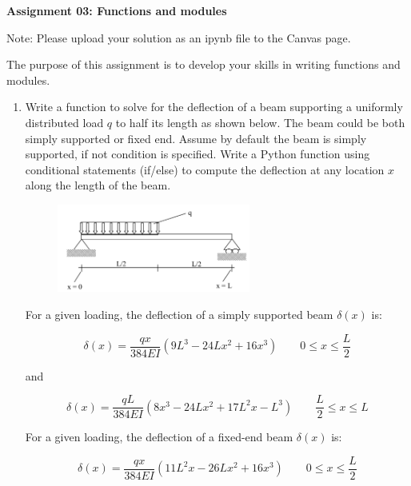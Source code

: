 \documentclass[a4paper,12pt]{article}
\begin{document}
\begin{centering}
	\textbf{
		Assignment 03: Functions and modules\\
	}
\end{centering}


Note: Please upload your solution as an ipynb file to the Canvas page.

\vspace{1em}
 
 The purpose of this assignment is to develop your skills in writing functions and modules.
 
\begin{enumerate}
	
	\item Write a function to solve for the deflection of a beam supporting a uniformly distributed load $q$ to half its length as shown below. The beam could be both simply supported or fixed end. Assume by default the beam is simply supported, if not condition is specified. Write a Python function using conditional statements (if/else) to compute the deflection at any location $x$ along the length of the beam.

	\begin{figure}[ht]
		\centering
		\includegraphics[width=0.6\textwidth]{ss-beam.png}
	\end{figure}

	For a given loading, the deflection of a simply supported beam $\delta(x)$ is:
	
	\begin{equation*}
		\delta(x) = \frac{q x}{384EI}(9L^3 - 24Lx^2 + 16x^3) \qquad 0 \le x \le \frac{L}{2}
	\end{equation*}
	
	and 

	\begin{equation*}
	\delta(x) = \frac{q L}{384EI}(8x^3 - 24Lx^2 + 17L^2x -L^3) \qquad \frac{L}{2} \le x \le L
	\end{equation*}
	
	For a given loading, the deflection of a fixed-end beam $\delta(x)$ is:
	
	\begin{equation*}
	\delta(x) = \frac{q x}{384EI}(11L^2x - 26Lx^2 + 16x^3) \qquad 0 \le x \le \frac{L}{2}
	\end{equation*}
	

\end{enumerate}
\end{document}
